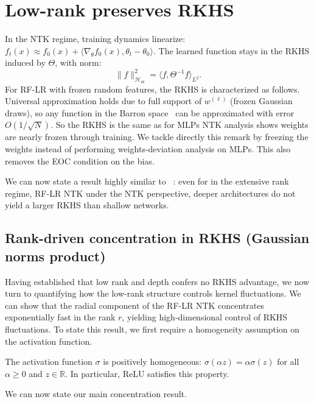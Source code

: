 \section{Low-rank preserves RKHS}\label{sec:no-rkhs-advantage}
In the NTK regime, training dynamics linearize: \( f_t(x) \approx f_0(x) + \langle \nabla_\theta f_0(x), \theta_t - \theta_0 \rangle \). The learned function stays in the RKHS induced by \( \Theta \), with norm:
\[
\|f\|_{\mathcal{H}_\Theta}^2 = \langle f, \Theta^{-1} f \rangle_{L^2}.
\]
For RF-LR with frozen random features, the RKHS is characterized as follows. Universal approximation holds due to full support of \( w^{(\ell)} \) (frozen Gaussian draws), so any function in the Barron space~\cite{e2021barronspaceflowinducedfunction} can be approximated with error \( O(1/\sqrt{N}) \). 
So the RKHS is the same as for MLPs NTK analysis shows weights are nearly frozen through training. We tackle directly this remark by freezing the weights instead of performing weights-deviation analysis on MLPs.
This also removes the EOC condition on the bias.

We can now state a result highly similar to ~\cite{bietti2021deepequalsshallowrelu}: even for in the extensive rank regime, RF-LR NTK under the NTK perspective, deeper architectures do not yield a larger RKHS than shallow networks.

\vspace{0.5em}
\subsection{Rank-driven concentration in RKHS (Gaussian norms product)}\label{subsec:rank-driven-concentration}
Having established that low rank and depth confers no RKHS advantage, we now turn to quantifying how the low-rank structure controls kernel fluctuations. We can show that the radial component of the RF-LR NTK concentrates exponentially fast in the rank \( r \), yielding high-dimensional control of RKHS fluctuations. To state this result, we first require a homogeneity assumption on the activation function.

\begin{assumption}
The activation function \( \sigma \) is positively homogeneous: \( \sigma(\alpha z) = \alpha \sigma(z) \) for all \( \alpha \ge 0 \) and \( z \in \mathbb{R} \). In particular, ReLU satisfies this property.
\end{assumption}

We can now state our main concentration result.

